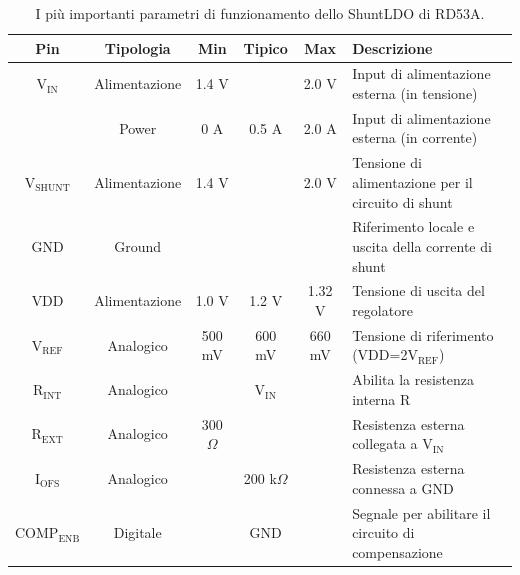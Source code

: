 \begin{table}
\begin{small}
\noindent\setlength\tabcolsep{4pt}%
\begin{tabularx}{\linewidth}{|c|c|c|c|c|l|}
\hline
\textbf{Pin} & \textbf{Tipologia} & \textbf{Min} & \textbf{Tipico} & \textbf{Max} & \textbf{Descrizione} \\ \hline
$\mathrm{V_{IN}}$ & Alimentazione & 1.4 V & & 2.0 V & Input di alimentazione esterna (in tensione)\\ \hline
 & Power & 0 A & 0.5 A & 2.0 A & Input di alimentazione esterna (in corrente)\\ \hline     
$\mathrm{V_{SHUNT}}$ & Alimentazione & 1.4 V & & 2.0 V & Tensione di alimentazione per il circuito di shunt\\ \hline
GND & Ground &  & &  & Riferimento locale e uscita della corrente di shunt\\ \hline
VDD & Alimentazione & 1.0 V & 1.2 V & 1.32 V & Tensione di uscita del regolatore\\ \hline
$\mathrm{V_{REF}}$ & Analogico & 500 mV & 600 mV & 660 mV & Tensione di riferimento (VDD=2$\mathrm{V_{REF}}$)\\ \hline
$\mathrm{R_{INT}}$ & Analogico &  & $\mathrm{V_{IN}}$ &  & Abilita la resistenza interna R\\ \hline
$\mathrm{R_{EXT}}$ & Analogico & 300 $\Omega$ &  &  & Resistenza esterna collegata a $\mathrm{V_{IN}}$\\ \hline
$\mathrm{I_{OFS}}$ & Analogico &  & 200 k$\Omega$ &  & Resistenza esterna connessa a GND\\ \hline
$\mathrm{COMP_{ENB}}$ & Digitale &  & GND &  & Segnale per abilitare il circuito di compensazione\\ \hline
\end{tabularx}
\end{small}
\caption{I pi\`u importanti parametri di funzionamento dello ShuntLDO di RD53A.}
\label{tab:sldord53a}
\end{table}


